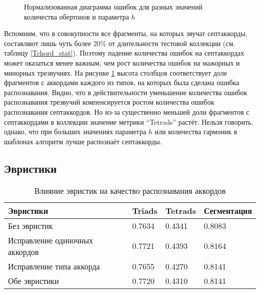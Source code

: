 \begin{figure}[h]
  \begin{minipage}[h]{0.49\linewidth}
  \end{minipage}
  \hfill
  \begin{minipage}[h]{0.49\linewidth}
  \end{minipage}
  \caption{Нормализованная диаграмма ошибок для разных значений количества
  обертонов и параметра $h$}
  \label{img:nHarmh_n}
\end{figure}

Вспомним, что в совокупности все фрагменты, на которых звучат септаккорды,
составляют лишь чуть более 20\% от длительности тестовой коллекции (см. таблицу
\ref{Tchord_stat}). Поэтому падение количества ошибок на септаккордах может
оказаться менее важным, чем рост количества ошибок на мажорных и минорных
трезвучиях. На рисунке \ref{img:nHarmh_n} высота столбцов соответствует доле
фрагментов с аккордами каждого из типов, на которых была сделана ошибка
распознавания. Видно, что в действительности уменьшение количества ошибок
распознавания трезвучий компенсируется ростом количества ошибок распознавания
септаккордов. Но из-за существенно меньшей доли фрагментов с септаккордами в
коллекции значение метрики ``Tetrads'' растёт. Нельзя говорить, однако, что при
больших значениях параметра $h$ или количества гармоник в шаблонах алгоритм
лучше распознаёт септаккорды.

\subsection{Эвристики} \label{ssect3_heuristics}

\begin{table} [htbp]
  \centering
  \parbox{15cm}{\caption{Влияние эвристик на качество распознавания аккордов}
  \label{THeuristics}}
  \begin{tabular}{|l|l|l|l|}
  \hline
  Эвристики & Triads & Tetrads & Сегментация \\
  \hline
  Без эвристик & 0.7634 & 0.4341 & 0.8083 \\
  Исправление одиночных аккордов & 0.7721 & 0.4393 & 0.8164 \\
  Исправление типа аккорда & 0.7655 & 0.4270 & 0.8141 \\
  Обе эвристики & 0.7720 & 0.4310 & 0.8141 \\
  \hline
  \end{tabular}
\end{table}

